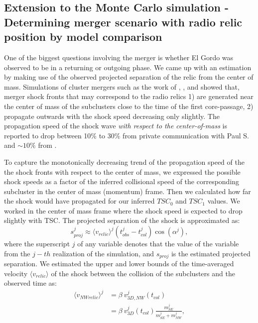 
\subsection{Extension to the Monte Carlo simulation - Determining merger
scenario with radio relic position by model comparison}

One of the biggest questions involving the merger is whether El Gordo was
observed to be in a returning or outgoing phase. We came up with an
estimation by making use of the observed projected separation of the relic from the
center of mass.
Simulations of cluster mergers such as the work of \citet{Paul2011b},
\citet{VanWeerenRJ2011}, and \citet{Springel2007} showed that, merger shock
fronts that may correspond to the radio relics 1) are generated near the
center of mass of the subclusters close to the time of the first
core-passage, 2) propagate outwards with the shock speed decreasing only slightly.
The propagation speed of the shock wave {\it with respect to the
center-of-mass} is reported to drop between 10\% to
30\% from private communication with Paul S. and $\sim 10\%$ from
\citet{Springel2007}. \par 
To capture the monotonically decreasing trend of the
propagation speed of the the shock fronts with respect to the center of
mass, we expressed the possible shock speeds as a factor of the inferred
collisional speed of the corresponding subcluster in the center of mass
(momentum) frame. 
Then we calculated how far the shock would have propagated for our inferred
$TSC_0$ and $TSC_1$ values. We worked in the center of mass frame where the
shock speed is expected to drop slightly with TSC. 
The projected separation of the shock is approximated as:
\begin{equation}
	s^j_{proj} \approx \langle v_{relic} \rangle^j (t^j_{obs} - t^j_{col})
	\cos(\alpha^j),
	\label{eq:proj_s_model}
\end{equation}
where the superscript $j$ of any variable denotes that the value of the
variable from the $j-th$ realization of the simulation, and $s_{proj}$ is the estimated projected
separation. We estimated the upper and lower bounds of the time-averaged velocity
$\langle v_{relic} \rangle$ of the shock between
the collision of the subclusters and the observed time as:  
\begin{align}
	\label{eqn:NW_speed}
	\langle v_{NW relic} \rangle^j &= \beta~v^j_{3D, NW}(t_{col}) \\
	&= \beta~v^j_{3D}(t_{col}) \frac{m^j_{SE}}{m^j_{SE} + m^j_{NW}}, 
\end{align}
